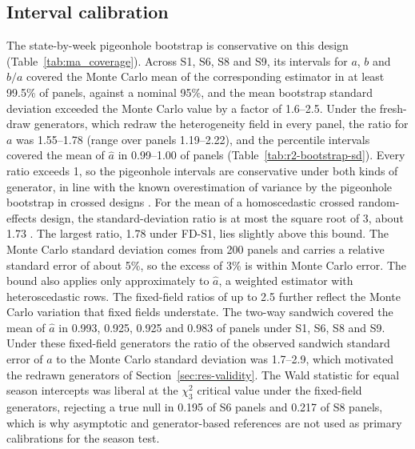 \subsection{Interval calibration}
\label{app:audit-intervals}

The state-by-week pigeonhole bootstrap is conservative on this design (Table~\ref{tab:ma_coverage}). Across S1, S6, S8 and S9, its intervals for $a$, $b$ and $b/a$ covered the Monte Carlo mean of the corresponding estimator in at least 99.5\% of panels, against a nominal 95\%, and the mean bootstrap standard deviation exceeded the Monte Carlo value by a factor of 1.6--2.5. Under the fresh-draw generators, which redraw the heterogeneity field in every panel, the ratio for $a$ was 1.55--1.78 (range over panels 1.19--2.22), and the percentile intervals covered the mean of $\hat a$ in 0.99--1.00 of panels (Table~\ref{tab:r2-bootstrap-sd}). Every ratio exceeds 1, so the pigeonhole intervals are conservative under both kinds of generator, in line with the known overestimation of variance by the pigeonhole bootstrap in crossed designs \citep{owen2007pigeonhole, owen2012bootstrapping}. For the mean of a homoscedastic crossed random-effects design, the standard-deviation ratio is at most the square root of 3, about 1.73 \citep{owen2007pigeonhole}. The largest ratio, 1.78 under FD-S1, lies slightly above this bound. The Monte Carlo standard deviation comes from 200 panels and carries a relative standard error of about 5\%, so the excess of 3\% is within Monte Carlo error. The bound also applies only approximately to $\hat a$, a weighted estimator with heteroscedastic rows. The fixed-field ratios of up to 2.5 further reflect the Monte Carlo variation that fixed fields understate. The two-way sandwich covered the mean of $\hat a$ in 0.993, 0.925, 0.925 and 0.983 of panels under S1, S6, S8 and S9. Under these fixed-field generators the ratio of the observed sandwich standard error of $a$ to the Monte Carlo standard deviation was 1.7--2.9, which motivated the redrawn generators of Section~\ref{sec:res-validity}. The Wald statistic for equal season intercepts was liberal at the $\chi^2_3$ critical value under the fixed-field generators, rejecting a true null in 0.195 of S6 panels and 0.217 of S8 panels, which is why asymptotic and generator-based references are not used as primary calibrations for the season test.






